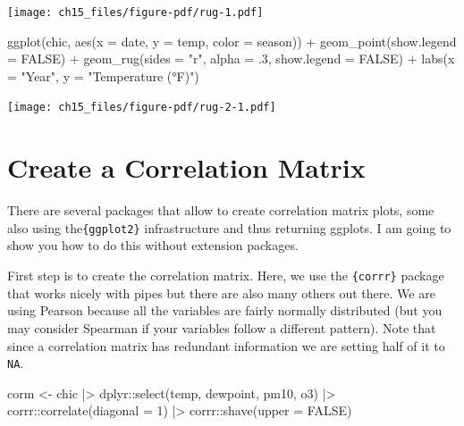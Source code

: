 \documentclass[
  letterpaper,
  DIV=11,
  numbers=noendperiod]{scrreprt}
\newenvironment{Shaded}{\begin{snugshade}}{\end{snugshade}}
\newcommand{\AttributeTok}[1]{\textcolor[rgb]{0.40,0.45,0.13}{#1}}
\newcommand{\ConstantTok}[1]{\textcolor[rgb]{0.56,0.35,0.01}{#1}}
\newcommand{\DecValTok}[1]{\textcolor[rgb]{0.68,0.00,0.00}{#1}}
\newcommand{\FunctionTok}[1]{\textcolor[rgb]{0.28,0.35,0.67}{#1}}
\newcommand{\NormalTok}[1]{\textcolor[rgb]{0.00,0.23,0.31}{#1}}
\newcommand{\OtherTok}[1]{\textcolor[rgb]{0.00,0.23,0.31}{#1}}
\newcommand{\SpecialCharTok}[1]{\textcolor[rgb]{0.37,0.37,0.37}{#1}}
\newcommand{\StringTok}[1]{\textcolor[rgb]{0.13,0.47,0.30}{#1}}
\begin{document}
\texttt{[image: ch15\_files/figure-pdf/rug-1.pdf]}

\begin{Shaded}
\begin{Highlighting}[]
\FunctionTok{ggplot}\NormalTok{(chic, }\FunctionTok{aes}\NormalTok{(}\AttributeTok{x =}\NormalTok{ date, }\AttributeTok{y =}\NormalTok{ temp, }\AttributeTok{color =}\NormalTok{ season)) }\SpecialCharTok{+}
  \FunctionTok{geom\_point}\NormalTok{(}\AttributeTok{show.legend =} \ConstantTok{FALSE}\NormalTok{) }\SpecialCharTok{+}
  \FunctionTok{geom\_rug}\NormalTok{(}\AttributeTok{sides =} \StringTok{"r"}\NormalTok{, }\AttributeTok{alpha =}\NormalTok{ .}\DecValTok{3}\NormalTok{, }\AttributeTok{show.legend =} \ConstantTok{FALSE}\NormalTok{) }\SpecialCharTok{+}
  \FunctionTok{labs}\NormalTok{(}\AttributeTok{x =} \StringTok{"Year"}\NormalTok{, }\AttributeTok{y =} \StringTok{"Temperature (°F)"}\NormalTok{)}
\end{Highlighting}
\end{Shaded}

\texttt{[image: ch15\_files/figure-pdf/rug-2-1.pdf]}

\section{Create a Correlation Matrix}\label{create-a-correlation-matrix}

There are several packages that allow to create correlation matrix
plots, some also using the\texttt{\{ggplot2\}} infrastructure and thus
returning ggplots. I am going to show you how to do this without
extension packages.

First step is to create the correlation matrix. Here, we use the
\texttt{\{corrr\}} package that works nicely with pipes but there are
also many others out there. We are using Pearson because all the
variables are fairly normally distributed (but you may consider Spearman
if your variables follow a different pattern). Note that since a
correlation matrix has redundant information we are setting half of it
to \texttt{NA}.

\begin{Shaded}
\begin{Highlighting}[]
\NormalTok{corm }\OtherTok{\textless{}{-}}
\NormalTok{  chic }\SpecialCharTok{|\textgreater{}}
\NormalTok{  dplyr}\SpecialCharTok{::}\FunctionTok{select}\NormalTok{(temp, dewpoint, pm10, o3) }\SpecialCharTok{|\textgreater{}}
\NormalTok{  corrr}\SpecialCharTok{::}\FunctionTok{correlate}\NormalTok{(}\AttributeTok{diagonal =} \DecValTok{1}\NormalTok{) }\SpecialCharTok{|\textgreater{}}
\NormalTok{  corrr}\SpecialCharTok{::}\FunctionTok{shave}\NormalTok{(}\AttributeTok{upper =} \ConstantTok{FALSE}\NormalTok{)}
\end{Highlighting}
\end{Shaded}
\end{document}
